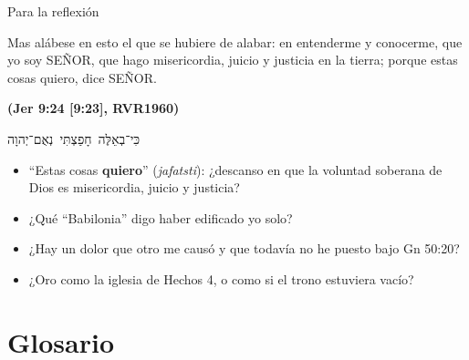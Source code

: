 \documentclass[hyperref={bookmarks=false},aspectratio=169]{beamer}
\newcommand{\heb}[1]{\mbox{\foreignlanguage{hebrew}{#1}}}
\newcommand{\SENOR}{S{\fontsize{0.78em}{1em}\selectfont EÑOR}}
\newcommand{\fuente}[1]{\par\hfill{\upshape\bfseries\footnotesize\textcolor{azul}{#1}}}
\newcommand{\destacar}[1]{\textbf{\textcolor{azul}{#1}}}
\begin{document}
\begin{frame}{Para la reflexión}
\begin{cita}Mas alábese en esto el que se hubiere de alabar: en entenderme y conocerme, que yo soy \SENOR, que hago misericordia, juicio y justicia en la tierra; porque estas cosas quiero, dice \SENOR.\fuente{(Jer 9:24 [9:23], RVR1960)}\end{cita}
\begin{center}\heb{כִּי־בְאֵלֶּה חָפַצְתִּי נְאֻם־יְהוָה}\end{center}
\small
\begin{itemize}
\item ``Estas cosas \destacar{quiero}'' (\emph{jafatsti}): ¿descanso en que la voluntad soberana de Dios es misericordia, juicio y justicia?
\item ¿Qué ``Babilonia'' digo haber edificado yo solo?
\item ¿Hay un dolor que otro me causó y que todavía no he puesto bajo Gn 50:20?
\item ¿Oro como la iglesia de Hechos 4, o como si el trono estuviera vacío?
\end{itemize}
\end{frame}

\section{Glosario}
\end{document}
